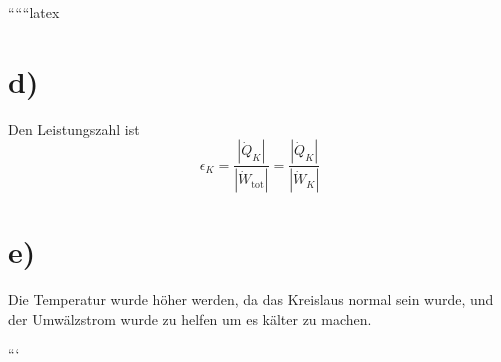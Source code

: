 ``````latex


\section*{d)}
Den Leistungszahl ist
\[
\epsilon_K = \frac{\left| \dot{Q}_K \right|}{\left| \dot{W}_{\text{tot}} \right|} = \frac{\left| \dot{Q}_K \right|}{\left| \dot{W}_K \right|}
\]

\section*{e)}
Die Temperatur wurde höher werden, da das Kreislaus normal sein wurde, und der Umwälzstrom wurde zu helfen um es kälter zu machen.

```